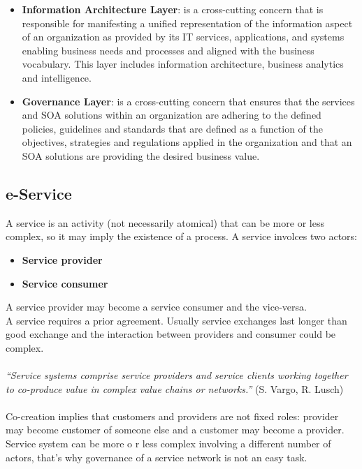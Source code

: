 \documentclass[10pt,a4paper]{article}
\begin{document}
\begin{itemize}
	\item \textbf{Information Architecture Layer}: is a cross-cutting concern that is responsible for manifesting a unified representation of the information aspect of an organization as provided by its IT services, applications, and systems enabling business needs and processes and aligned with the business vocabulary. This layer includes information architecture, business analytics and intelligence.
	\item \textbf{Governance Layer}: is a cross-cutting concern that ensures that the services and SOA solutions within an organization are adhering to the defined policies, guidelines and standards that are defined as a function of the objectives, strategies and regulations applied in the organization and that an SOA solutions are providing the desired business value.
\end{itemize}
\subsection{e-Service}
A service is an activity (not necessarily atomical) that can be more or less complex, so it may imply the existence of a process. A service involces two actors: 
\begin{itemize}
	\item \textbf{Service provider}
	\item \textbf{Service consumer}
\end{itemize}
A service provider may become a service consumer and the vice-versa. \\ 
A service requires a prior agreement. Usually service exchanges last longer than good exchange and the interaction between providers and consumer could be complex. \\ \\
\textit{“Service systems comprise service providers and service clients working together to co-produce value in complex value chains or networks.”} (S. Vargo, R. Lusch)\\ \\
Co-creation implies that customers and providers are not fixed roles: provider may become customer of someone else and a customer may become a provider. \\
Service system can be more o r less complex involving a different number of actors, that's why governance of a service network is not an easy task.
\end{document}
